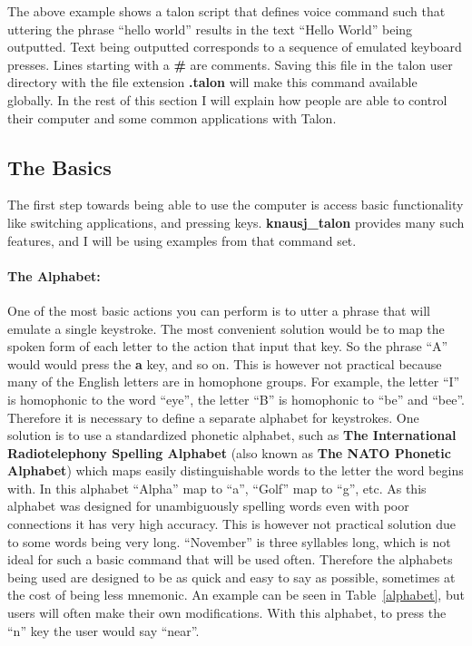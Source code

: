 \documentclass[../thesis.tex]{subfiles}
\begin{document}
The above example shows a talon script that defines voice command such that uttering the phrase ``hello world''
results in the text ``Hello World'' being outputted.
Text being outputted corresponds to
a sequence of emulated keyboard presses.
Lines starting with a \textbf{\#} are comments.
Saving this file in the talon user directory with the file extension \textbf{.talon} will make this command available globally.
In the rest of this section I will explain how people are able to control their computer and some common applications with Talon.

\subsection{The Basics}
The first step towards being able to use the computer is access basic functionality like switching applications, and pressing keys.
\textbf{knausj\_talon} provides many such features, and I will be using examples from that command set.

\paragraph{The Alphabet:}
One of the most basic actions you can perform is to utter a phrase that will emulate a single keystroke.
The most convenient solution would be to map the spoken form of each letter to the action that input that key.
So the phrase ``A'' would would press the \textbf{a} key, and so on.
This is however not practical because many of the English letters are in homophone groups.
For example, the letter ``I'' is homophonic to the word ``eye'', the letter ``B'' is homophonic to ``be'' and ``bee''.
Therefore it is necessary to define a separate alphabet for keystrokes.
One solution is to use a standardized phonetic alphabet, such as \textbf{The International Radiotelephony Spelling Alphabet}
(also known as \textbf{The NATO Phonetic Alphabet}) which maps easily distinguishable words to the letter the word begins with.
In this alphabet ``Alpha'' map to ``a'', ``Golf'' map to ``g'', etc.
As this alphabet was designed for unambiguously spelling words even with poor connections it has very high accuracy.
This is however not practical solution due to some words being very long. ``November'' is three syllables long, which
is not ideal for such a basic command that will be used often.
Therefore the alphabets being used are designed to be as quick and easy to say as possible, sometimes at the cost of
being less mnemonic. An example can be seen in Table~\ref{alphabet}, but users will often make their own
modifications. With this alphabet, to press the ``n'' key the user would say ``near''.
\end{document}
